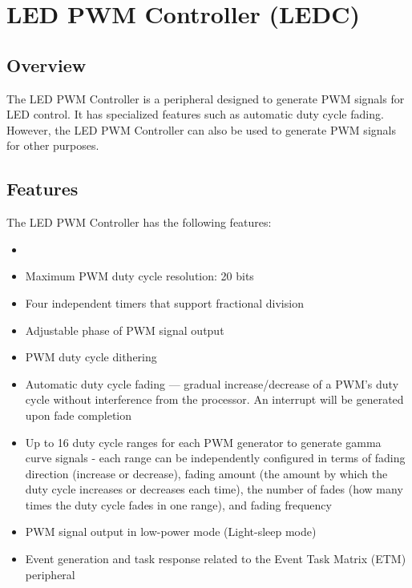 \documentclass[main\_\_EN.tex]{subfiles}
\begin{document}

\ifglobal
\else
    {\let\clearpage\relax \listoftodos}
    {\let\clearpage\relax \listofdonetodos}
    \tableofcontents
\fi











\hypertarget{ledpwm}{}
\chapter{LED PWM Controller (LEDC)}
\label{mod:ledpwm}

\section{Overview}

The LED PWM Controller is a peripheral designed to generate PWM signals for LED control. It has specialized features such as automatic duty cycle fading. However, the LED PWM Controller can also be used to generate PWM signals for other purposes.

\section{Features}
The LED PWM Controller has the following features:
\begin{itemize}
    \item {}
    \item Maximum PWM duty cycle resolution: 20 bits
    \item Four independent timers that support fractional division
    \item Adjustable phase of PWM signal output
    \item PWM duty cycle dithering
    \item Automatic duty cycle fading — gradual increase/decrease of a PWM's duty cycle without interference from the processor. An interrupt will be generated upon fade completion
    \item Up to 16 duty cycle ranges for each PWM generator to generate gamma curve signals - each range can be independently configured in terms of fading direction (increase or decrease), fading amount (the amount by which the duty cycle increases or decreases each time), the number of fades (how many times the duty cycle fades in one range), and fading frequency
    \item PWM signal output in low-power mode (Light-sleep mode)
    \item Event generation and task response related to the Event Task Matrix (ETM) peripheral
\end{itemize}
\end{document}
